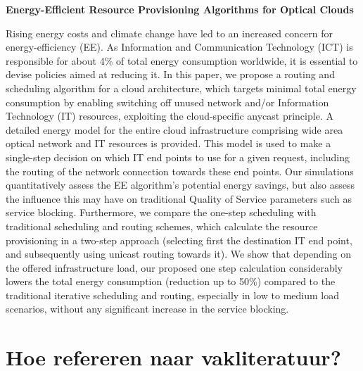 \documentclass[aspectratio=169]{beamer}
\begin{document}
\begin{frame}

  \begin{center}
  \end{center}

  \scriptsize
  \textbf{Energy-Efficient Resource Provisioning Algorithms for Optical Clouds}

  \alert<1>{Rising energy costs and climate change have led to an increased concern for energy-efficiency (EE).} \alert<2>{As Information and Communication Technology (ICT) is responsible for about 4\% of total energy consumption worldwide, it is essential to devise policies aimed at reducing it.} \alert<3>{In this paper, we propose a routing and scheduling algorithm for a cloud architecture, which targets minimal total energy consumption by enabling switching off unused network and/or Information Technology (IT) resources, exploiting the cloud-specific anycast principle.} \alert<4>{A detailed energy model for the entire cloud infrastructure comprising wide area optical network and IT resources is provided. This model is used to make a single-step decision on which IT end points to use for a given request, including the routing of the network connection towards these end points. Our simulations quantitatively assess the EE algorithm’s potential energy savings, but also assess the influence this may have on traditional Quality of Service parameters such as service blocking. Furthermore, we compare the one-step scheduling with traditional scheduling and routing schemes, which calculate the resource provisioning in a two-step approach (selecting first the destination IT end point, and subsequently using unicast routing towards it).} \alert<5>{We show that depending on the offered infrastructure load, our proposed one step calculation considerably lowers the total energy consumption (reduction up to 50\%) compared to the traditional iterative scheduling and routing, especially in low to medium load scenarios, without any significant increase in the service blocking.}

\end{frame}



\section{Hoe refereren naar vakliteratuur?}
\end{document}
